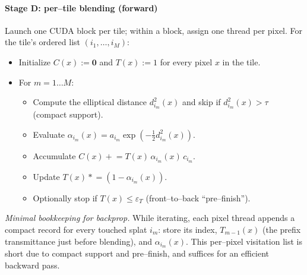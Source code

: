 \begin{enrichment}
\begin{enrichment}
\begin{enrichment}
        \paragraph{Stage D: per–tile blending (forward)}
        Launch one CUDA block per tile; within a block, assign one thread per pixel. For the tile’s ordered list $(i_1,\dots,i_M)$:
        \begin{itemize}
            \item Initialize $C(x){:=}\mathbf{0}$ and $T(x){:=}1$ for every pixel $x$ in the tile.
            \item For $m=1\ldots M$:
            \begin{itemize}
                \item Compute the elliptical distance $d_{i_m}^2(x)$ and skip if $d_{i_m}^2(x)>\tau$ (compact support).
                \item Evaluate $\alpha_{i_m}(x)=a_{i_m}\exp(-\tfrac12 d_{i_m}^2(x))$.
                \item Accumulate $C(x)\mathrel{+}= T(x)\,\alpha_{i_m}(x)\,c_{i_m}$.
                \item Update $T(x)\mathrel{*}=(1-\alpha_{i_m}(x))$.
                \item Optionally stop if $T(x)\le \varepsilon_T$ (front–to–back “pre–finish”).
            \end{itemize}
        \end{itemize}
        \emph{Minimal bookkeeping for backprop.} While iterating, each pixel thread appends a compact record for every touched splat $i_m$: store its index, $T_{m-1}(x)$ (the prefix transmittance just before blending), and $\alpha_{i_m}(x)$. This per–pixel visitation list is short due to compact support and pre–finish, and suffices for an efficient backward pass.
        

\end{enrichment}
\end{enrichment}
\end{enrichment}
